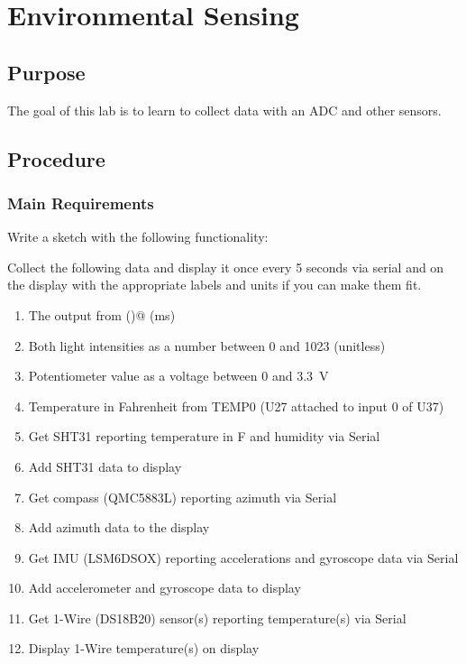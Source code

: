 \chapter{Environmental Sensing}

\section{Purpose}
The goal of this lab is to learn to collect data with an ADC and other sensors.

\section{Procedure}
\subsection{Main Requirements}
Write a sketch with the following functionality:

Collect the following data and display it once every 5 seconds via serial and on the display with the 
appropriate labels and units if you can make them fit.
\begin{enumerate}
	\item The output from \lstinline@millis()@ (ms)
	\item Both light intensities as a number between 0 and 1023 (unitless)
	\item Potentiometer value as a voltage between 0 and 3.3~V
	\item Temperature in Fahrenheit from TEMP0 (U27 attached to input 0 of U37)
    \item Get SHT31 reporting temperature in F and humidity via Serial
    \item Add SHT31 data to display 
    \item Get compass (QMC5883L) reporting azimuth via Serial
    \item Add azimuth data to the display
    \item Get IMU (LSM6DSOX) reporting accelerations and gyroscope data via Serial 
    \item Add accelerometer and gyroscope data to display
    \item Get 1-Wire (DS18B20) sensor(s) reporting temperature(s) via Serial
    \item Display 1-Wire temperature(s) on display
\end{enumerate}


